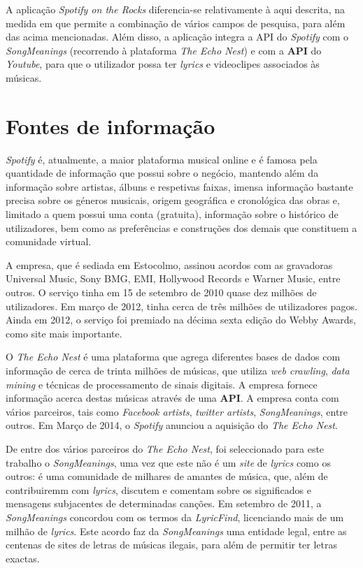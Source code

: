\documentclass[twocolumn,twoside,11pt,a4paper]{article}
\begin{document}
A aplicação \textit{Spotify on the Rocks} diferencia-se relativamente à aqui descrita,
na medida em que permite a combinação de vários campos de pesquisa, para além das
acima mencionadas.
Além disso, a aplicação integra a API do \textit{Spotify} com o \textit{SongMeanings}
(recorrendo à plataforma \textit{The Echo Nest}) e com a \textbf{API} do
\textit{Youtube}, para que o utilizador possa ter \textit{lyrics} e videoclipes
associados às músicas.



\section{Fontes de informação}\label{sec:sources}

\textit{Spotify} é, atualmente, a maior plataforma musical online e é famosa pela
quantidade de informação que possui sobre o negócio, mantendo além da informação
sobre artistas, álbuns e respetivas faixas, imensa informação bastante precisa sobre
os géneros musicais, origem geográfica e cronológica das obras e, limitado a quem
possui uma conta (gratuita), informação sobre o histórico de utilizadores, bem como as
preferências e construções dos demais que constituem a comunidade virtual.


A empresa, que é sediada em Estocolmo, assinou acordos com as gravadoras Universal
Music, Sony BMG, EMI, Hollywood Records e Warner Music, entre outros. O serviço tinha em
15 de setembro de 2010 quase dez milhões de utilizadores. Em março de 2012, tinha cerca
de três milhões de utilizadores pagos. Ainda em 2012, o serviço foi premiado na décima
sexta edição do Webby Awards, como site mais importante.


O \textit{The Echo Nest} é uma plataforma que agrega diferentes bases de dados com
informação de cerca de trinta milhões de músicas, que utiliza \textit{web crawling},
\textit{data mining} e técnicas de processamento de sinais digitais. A empresa fornece
informação acerca destas músicas através de uma \textbf{API}.
A empresa conta com vários parceiros, tais como \textit{Facebook artists},
\textit{twitter artists}, \textit{SongMeanings}, entre outros.
Em Março de 2014, o \textit{Spotify} anunciou a aquisição do \textit{The Echo Nest}.


De entre dos vários parceiros do \textit{The Echo Nest}, foi seleccionado para este
trabalho o \textit{SongMeanings}, uma vez que este não é um \textit{site} de
\textit{lyrics} como os outros: é uma comunidade de milhares de amantes de música, que,
além de contribuiremm com \textit{lyrics}, discutem e comentam sobre os significados e
mensagens subjacentes de determinadas canções.
Em setembro de 2011, a \textit{SongMeanings} concordou com os termos da
\textit{LyricFind}, licenciando mais de um milhão de \textit{lyrics}. Este acordo faz da
\textit{SongMeanings} uma entidade legal, entre as centenas de sites de letras de
músicas ilegais, para além de permitir ter letras exactas.
\end{document}

